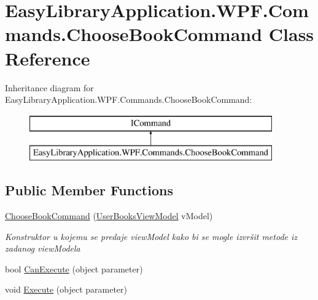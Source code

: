 \hypertarget{class_easy_library_application_1_1_w_p_f_1_1_commands_1_1_choose_book_command}{}\section{Easy\+Library\+Application.\+W\+P\+F.\+Commands.\+Choose\+Book\+Command Class Reference}
\label{class_easy_library_application_1_1_w_p_f_1_1_commands_1_1_choose_book_command}
Inheritance diagram for Easy\+Library\+Application.\+W\+P\+F.\+Commands.\+Choose\+Book\+Command\+:\begin{figure}[H]
\begin{center}
\leavevmode
\includegraphics[height=2.000000cm]{class_easy_library_application_1_1_w_p_f_1_1_commands_1_1_choose_book_command}
\end{center}
\end{figure}
\subsection*{Public Member Functions}
\begin{DoxyCompactItemize}
\item 
\mbox{\hyperlink{class_easy_library_application_1_1_w_p_f_1_1_commands_1_1_choose_book_command_a50f49dceebfda770c19f41204a7f9fab}{Choose\+Book\+Command}} (\mbox{\hyperlink{class_easy_library_application_1_1_w_p_f_1_1_view_model_1_1_user_books_view_model}{User\+Books\+View\+Model}} v\+Model)
\begin{DoxyCompactList}\small\item\em Konstruktor u kojemu se predaje view\+Model kako bi se mogle izvršit metode iz zadanog view\+Modela \end{DoxyCompactList}\item 
bool \mbox{\hyperlink{class_easy_library_application_1_1_w_p_f_1_1_commands_1_1_choose_book_command_aeae386972dd6368730ef6a618bcc7213}{Can\+Execute}} (object parameter)
\item 
void \mbox{\hyperlink{class_easy_library_application_1_1_w_p_f_1_1_commands_1_1_choose_book_command_ac44943ebdde4e4e7192b848e55e3cd0b}{Execute}} (object parameter)
\end{DoxyCompactItemize}
